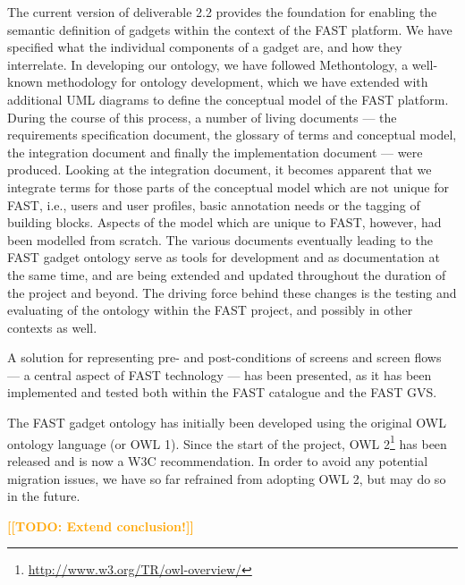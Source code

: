 \documentclass[twoside]{fast_latex}
\newcommand{\todo}[1]{\textsf{\textbf{\textcolor{Orange}{[[TODO: #1]]}}}}
\newcommand{\todo}[1]{}
\begin{document}
The current version of deliverable 2.2 provides the foundation for enabling the semantic definition of gadgets within the context of the FAST platform. We have specified what the individual components of a gadget are, and how they interrelate. In developing our ontology, we have followed Methontology, a well-known methodology for ontology development, which we have extended with additional UML diagrams to define the conceptual model of the FAST platform. During the course of this process, a number of living documents --- the requirements specification document, the glossary of terms and conceptual model, the integration document and finally the implementation document --- were produced. 
Looking at the integration document, it becomes apparent that we integrate terms for those parts of the conceptual model which are not unique for FAST, i.e., users and user profiles, basic annotation needs or the tagging of building blocks. Aspects of the model which are unique to FAST, however, had been modelled from scratch.
The various documents eventually leading to the FAST gadget ontology serve as tools for development and as documentation at the same time, and are being extended and updated throughout the duration of the project and beyond. The driving force behind these changes is the testing and evaluating of the ontology within the FAST project, and possibly in other contexts as well.

A solution for representing pre- and post-conditions of screens and screen flows --- a central aspect of FAST technology --- has been presented, as it has been implemented and tested both within the FAST catalogue and the FAST GVS.

The FAST gadget ontology has initially been developed using the original OWL ontology language (or OWL 1). Since the start of the project, OWL 2\footnote{\url{http://www.w3.org/TR/owl-overview/}} has been released and is now a W3C recommendation. In order to avoid any potential migration issues, we have so far refrained from adopting OWL 2, but may do so in the future.

\todo{Extend conclusion!}


% 
\end{document}

